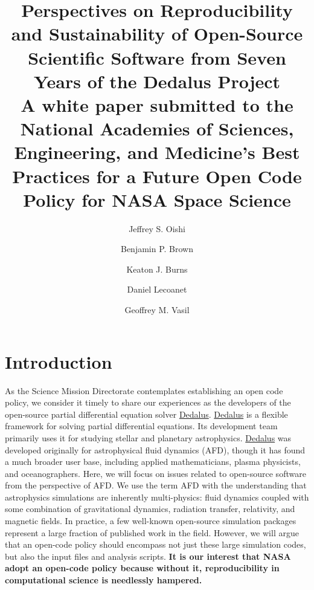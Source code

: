 \documentclass[12pt, titlepage]{aastex62}
\newcommand{\dedalus}{\href{http://dedalus-project.org}{Dedalus}}
\begin{document}
\title{Perspectives on Reproducibility and Sustainability of Open-Source Scientific Software from Seven Years of the Dedalus Project\\{\footnotesize A white paper submitted to the National Academies of Sciences, Engineering, and Medicine's Best Practices for a Future Open Code Policy for NASA Space Science}}
\author{Jeffrey S. Oishi}


\author{Benjamin P. Brown}
\author{Keaton J. Burns}
\author{Daniel Lecoanet}
\author{Geoffrey M. Vasil}

\section{Introduction}
\label{sec:intro}
As the Science Mission Directorate contemplates establishing an open code policy, we consider it timely to share our experiences as the developers of the open-source partial differential equation solver \dedalus{}. \dedalus{} is a flexible framework for solving partial differential equations. Its development team primarily uses it for studying stellar and planetary astrophysics.  \dedalus{} was developed originally for astrophysical fluid dynamics (AFD), though it has found a much broader user base, including applied mathematicians, plasma physicists, and oceanographers. Here, we will focus on issues related to open-source software from the perspective of AFD. We use the term AFD with the understanding that astrophysics simulations are inherently multi-physics: fluid dynamics coupled with some combination of gravitational dynamics, radiation transfer, relativity, and magnetic fields. In practice, a few well-known open-source simulation packages represent a large fraction of published work in the field. However, we will argue that an open-code policy should encompass not just these large simulation codes, but also the input files and analysis scripts. \textbf{It is our interest that NASA adopt an open-code policy because without it, reproducibility in computational science is needlessly hampered.} 
\end{document}
